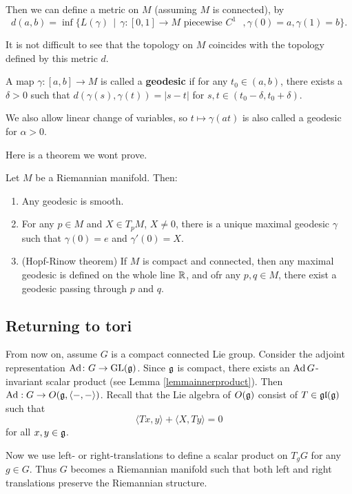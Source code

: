 \documentclass[11pt, english]{article}
\begin{document}
Then we can define a metric on $M$ (assuming $M$ is connected), by
$$
d(a,b) = \inf \{ L(\gamma) \, \mid \, \gamma:[0,1] \to M \text{ piecewise $C^1$ }, \gamma(0)=a, \gamma(1)=b \}.
$$

It is not difficult to see that the topology on $M$ coincides with the topology defined by this metric $d$.

A map $\gamma:[a,b] \to M$ is called a \textbf{geodesic} if for any $t_0 \in (a,b)$, there exists a $\delta > 0$ such that $d( \gamma(s), \gamma(t) ) = \lvert s - t \rvert$ for $s,t \in (t_0-\delta, t_0+\delta)$. 

We also allow linear change of variables, so $t \mapsto \gamma(a t)$ is also called a geodesic for $\alpha > 0$. 

Here is a theorem we wont prove.

\begin{thm}
\label{theoremgeodesic}
  Let $M$ be a Riemannian manifold. Then:
  \begin{enumerate}
  \item Any geodesic is smooth.
\item For any $p \in M$ and $X \in T_pM$, $X \neq 0$, there is a unique maximal geodesic $\gamma$ such that $\gamma(0)=e$ and $\gamma'(0)=X$.
\item (Hopf-Rinow theorem) If $M$ is compact and connected, then any maximal geodesic is defined on the whole line $\mathbb{R}$, and ofr any $p,q \in M$, there exist a geodesic passing through $p$ and $q$. 
  \end{enumerate}
\end{thm}

\subsection{Returning to tori}

From now on, assume $G$ is a compact connected Lie group. Consider the adjoint representation $\operatorname{Ad} \colon  G \to \operatorname{GL}(\mathfrak g)$. Since $\mathfrak g$ is compact, there exists an $\operatorname{Ad} G$-invariant scalar product (see Lemma \ref{lemmainnerproduct}). Then $\operatorname{Ad}:G \to O(\mathfrak g, \langle-,- \rangle)$. Recall that the Lie algebra of $O(\mathfrak g)$ consist of $T \in \mathfrak{gl}(\mathfrak g)$ such that
$$
\langle Tx,y  \rangle  + \langle X,Ty \rangle = 0
$$
for all $x,y \in \mathfrak g$. 

Now we use left- or right-translations to define a scalar product on $T_gG$ for any $g \in G$. Thus $G$ becomes a Riemannian manifold such that both left and right translations preserve the Riemannian structure.
\end{document}
